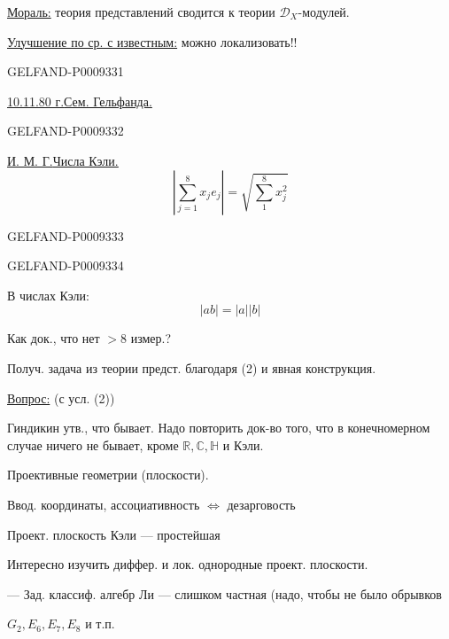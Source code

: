 \underline{Мораль:} теория представлений сводится к теории $\mathcal D_X$-модулей.

\underline{Улучшение по ср. с известным:} можно локализовать!!

\begin{GelfandAdjacentEvidence}{GELFAND-P000933}{1}

\underline{\underline{10.11.80 г.}}\qquad\underline{Сем. Гельфанда.}
\end{GelfandAdjacentEvidence}
\begin{GelfandAdjacentEvidence}{GELFAND-P000933}{2}


\underline{И. М. Г.}\qquad\underline{\underline{Числа Кэли.}}
\begin{equation*}
 \left|\sum_{j=1}^{8}x_j e_j\right|=\sqrt{\sum_{1}^{8}x_j^2}
 \tag{1}
\end{equation*}
\end{GelfandAdjacentEvidence}
\begin{GelfandAdjacentEvidence}{GELFAND-P000933}{3}

\end{GelfandAdjacentEvidence}
\begin{GelfandAdjacentEvidence}{GELFAND-P000933}{4}


В числах Кэли:
\begin{equation*}
 |ab|=|a||b|
 \tag{2}
\end{equation*}

Как док., что нет $>8$ измер.?

Получ. задача из теории предст. благодаря (2) и явная конструкция.

\underline{Вопрос:}  (с усл. (2))

Гиндикин утв., что бывает. Надо повторить док-во того, что в конечномерном случае ничего не бывает, кроме $\mathbb R,\mathbb C,\mathbb H$ и Кэли.

Проективные геометрии (плоскости).

Ввод. координаты, ассоциативность $\Leftrightarrow$ дезарговость

Проект. плоскость Кэли --- простейшая 

Интересно изучить диффер. и лок. однородные проект. плоскости.

--- Зад. классиф. алгебр Ли --- слишком частная (надо, чтобы не было обрывков

\hfill $G_2,E_6,E_7,E_8$ и т.п.
\end{GelfandAdjacentEvidence}
